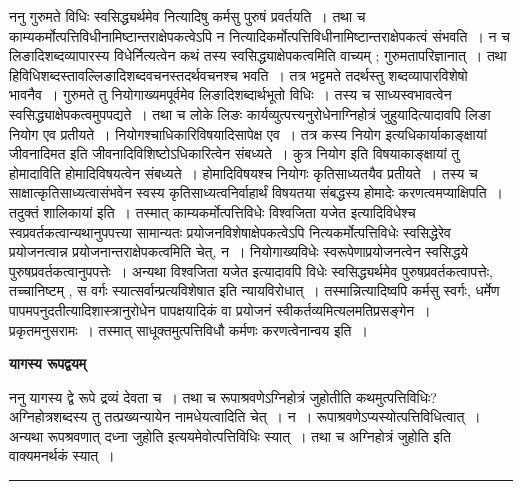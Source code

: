 \documentclass[11pt, openany]{book}
\begin{document}
 {\br ननु} गुरुमते विधिः स्वसिद्ध्यर्थमेव नित्यादिषु कर्मसु पुरुषं प्रवर्तयति~। तथा च काम्यकर्मोत्पत्तिविधीनामिष्टान्तराक्षेपकत्वेऽपि न नित्यादिकर्मोत्पत्तिविधीनामिष्टान्तराक्षेपकत्वं संभवति~। न च लिङादिशब्दव्यापारस्य विधेर्नित्यत्वेन कथं तस्य स्वसिद्ध्याक्षेपकत्वमिति वाच्यम् ; गुरुमतापरिज्ञानात्~। तथा
हि\textendash विधिशब्दस्तावल्लिङादिशब्दवचनस्तदर्थवचनश्च भवति~। तत्र भट्टमते तदर्थस्तु शब्दव्यापारविशेषो भावनैव~। गुरुमते तु नियोगाख्यमपूर्वमेव
लिङादिशब्दार्थभूतो विधिः~। तस्य च साध्यस्वभावत्वेन स्वसिद्ध्याक्षेपकत्वमुपपद्यते~। तथा च लोके लिङः कार्यव्युत्पत्त्यनुरोधेनाग्निहोत्रं जुहुयादित्यादावपि लिङा नियोग एव
प्रतीयते~। नियोगश्चाधिकारिविषयादिसापेक्ष एव~। तत्र कस्य नियोग इत्यधिकार्याकाङ्क्षायां जीवनादिमत इति जीवनादिविशिष्टोऽधिकारित्वेन संबध्यते~। कुत्र नियोग इति विषयाकाङ्क्षायां तु होमादाविति होमादिविषयत्वेन संबध्यते~। होमादिविषयश्च नियोगः कृतिसाध्यतयैव प्रतीयते~। तस्य च साक्षात्कृतिसाध्यत्वासंभवेन स्वस्य कृतिसाध्यत्वनिर्वाहार्थं विषयतया संबद्धस्य होमादेः करणत्वमप्याक्षिपति~। तदुक्तं शालिकायां इति~। तस्मात् काम्यकर्मोत्पत्तिविधेः {\qt विश्वजिता यजेत} इत्यादिविधेश्च स्वप्रवर्तकत्वान्यथानुपपत्त्या सामान्यतः
प्रयोजनविशेषाक्षेपकत्वेऽपि नित्यकर्मोत्पत्तिविधेः स्वसिद्धेरेव प्रयोजनत्वान्न प्रयोजनान्तराक्षेपकत्वमिति चेत्, न~। नियोगाख्यविधेः स्वरूपेणाप्रयोजनत्वेन स्वसिद्धये पुरुषप्रवर्तकत्वानुपपत्तेः~। अन्यथा {\qt विश्वजिता यजेत} इत्यादावपि विधेः स्वसिद्ध्यर्थमेव पुरुषप्रवर्तकत्वापत्तेः, तच्चानिष्टम् , {\qt स वर्गः स्यात्सर्वान्प्रत्यविशेषात} इति न्यायविरोधात्~। तस्मान्नित्यादिष्वपि कर्मसु स्वर्गः, धर्मेण पापमपनुदतीत्यादिशास्त्रानुरोधेन पापक्षयादिकं वा प्रयोजनं स्वीकर्तव्यमित्यलमतिप्रसङ्गेन~। प्रकृतमनुसरामः~। तस्मात् साधूक्तमुत्पत्तिविधौ कर्मणः करणत्वेनान्वय इति~।
\newpage
\lfoot{}
\fancyhead[RE]{[ यागस्य रूपद्वयम् ]}
\begin{center}
\textbf{यागस्य रूपद्वयम्}   
\end{center}

{\bl ननु यागस्य द्वे रूपे द्रव्यं देवता च~। तथा च रूपाश्रवणेऽग्निहोत्रं जुहोतीति कथमुत्पत्तिविधिः? अग्निहोत्रशब्दस्य तु तत्प्रख्यन्यायेन नामधेयत्वादिति चेत्~। न~। रूपाश्रवणेऽप्यस्योत्पत्तिविधित्वात्~। अन्यथा रूपश्रवणात् {\al दध्ना जुहोति} इत्ययमेवोत्पत्तिविधिः स्यात्~। तथा च {\qtl अग्निहोत्रं जुहोति} इति वाक्यमनर्थकं स्यात्~।}\\
\hrule
\vspace{3mm}
\end{document}
